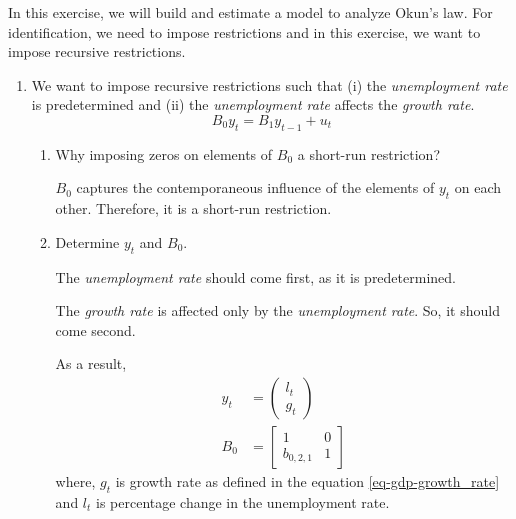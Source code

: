 In this exercise, we will build and estimate a \svarp{} model to analyze Okun's law. For identification, we need to impose restrictions and in this exercise, we want to impose recursive restrictions.

\begin{enumerate}
    \item We want to impose recursive restrictions such that (i) the \emph{unemployment rate} is predetermined and (ii) the \emph{unemployment rate} affects the \emph{growth rate}.
          \[ B_0 y_t = B_1 y_{t-1} + u_t \]

          \begin{enumerate}[label=\roman*.]
              \item Why imposing zeros on elements of $B_0$ a short-run restriction?

                    \begin{sol}
                        $B_0$ captures the contemporaneous influence of the elements of $y_t$ on each other. Therefore, it is a short-run restriction.
                    \end{sol}

              \item Determine $y_t$ and $B_0$.

                    \begin{sol}
                        The \emph{unemployment rate} should come first, as it is predetermined.

                        The \emph{growth rate} is affected only by the \emph{unemployment rate}. So, it should come second.

                        As a result,
                        \begin{align*}
                            y_t & = \begin{pmatrix} l_t \\ g_t \end{pmatrix}
                            \\[0.2cm]
                            B_0 & = \begin{bmatrix}
                                        1           & 0 \\
                                        b_{0, 2, 1} & 1
                                    \end{bmatrix}
                        \end{align*}
                        where, $g_t$ is growth rate as defined in the equation \ref{eq-gdp-growth_rate} and $l_t$ is percentage change in the unemployment rate.
                    \end{sol}


\end{enumerate}
\end{enumerate}
